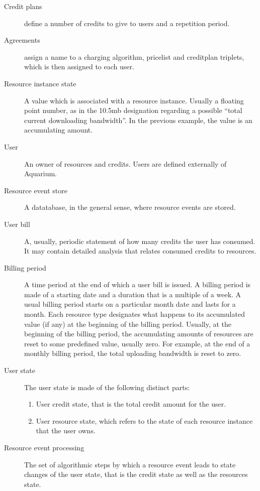 \documentclass[preprint,10pt]{sigplanconf}
\begin{document}
\begin{description}
\item[Credit plans] define a number of credits to give to users and a repetition
        period.

\item[Agreements] assign a name to a charging algorithm, pricelist and creditplan triplets,
        which is then assigned to each user.
        

\item[Resource instance state]
    A value which is associated with a resource instance. Usually a floating point number, as in the 10.5{\sc mb} designation regarding a possible ``total current downloading bandwidth''. In the previous example, the value is an accumulating amount.

\item[User]
An owner of resources and credits. Users are defined externally of Aquarium.

\item[Resource event store]
A datatabase, in the general sense, where resource events are stored.

\item[User bill]
A, usually, periodic statement of how many credits the user has consumed. It may contain detailed analysis that relates consumed credits to resources.
  
\item[Billing period]
A time period at the end of which a user bill is issued.
A billing period is made of a starting date and a duration that is a multiple of a week.
A usual billing period starts on a particular month date and lasts for a month.
Each resource type designates what happens to its accumulated value (if any) at the beginning of the billing period. Usually, at the beginning of the billing period, the accumulating amounts of resources are reset to some predefined value, usually zero. For example, at the end of a monthly billing period, the total uploading bandwidth is reset to zero.
   
\item[User state]
The user state is made of the following distinct parts:
\begin{enumerate}
\item User credit state, that is the total credit amount for the user.

\item User resource state, which refers to the state of each resource instance that the user owns.
\end{enumerate}

\item[Resource event processing]
The set of algorithmic steps by which a resource event leads to state changes of the user state, that is the credit state as well as the resources state.

\end{description}
\end{document}
